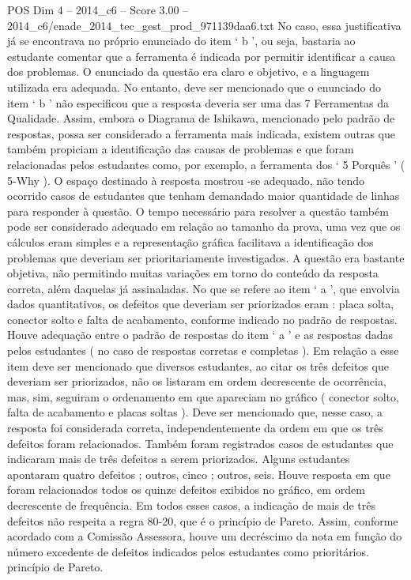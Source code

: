 \begin{textsample}{POS Dim 4 – 2014\_c6 – Score 3.00 – 2014\_c6/enade\_2014\_tec\_gest\_prod\_971139daa6.txt}
No caso, essa justificativa já se encontrava no próprio enunciado do item ‘ b ’, ou seja, bastaria ao estudante comentar que a ferramenta é indicada por permitir identificar a causa dos problemas.
O enunciado da questão era claro e objetivo, e a linguagem utilizada era adequada.
No entanto, deve ser mencionado que o enunciado do item ‘ b ’ não especificou que a resposta deveria ser uma das 7 Ferramentas da Qualidade.
Assim, embora o Diagrama de Ishikawa, mencionado pelo padrão de respostas, possa ser considerado a ferramenta mais indicada, existem outras que também propiciam a identificação das causas de problemas e que foram relacionadas pelos estudantes como, por exemplo, a ferramenta dos ‘ 5 Porquês ’ ( 5-Why ).
O espaço destinado à resposta mostrou -se adequado, não tendo ocorrido casos de estudantes que tenham demandado maior quantidade de linhas para responder à questão.
O tempo necessário para resolver a questão também pode ser considerado adequado em relação ao tamanho da prova, uma vez que os cálculos eram simples e a representação gráfica facilitava a identificação dos problemas que deveriam ser prioritariamente investigados.
A questão era bastante objetiva, não permitindo muitas variações em torno do conteúdo da resposta correta, além daquelas já assinaladas.
No que se refere ao item ‘ a ’, que envolvia dados quantitativos, os defeitos que deveriam ser priorizados eram : placa solta, conector solto e falta de acabamento, conforme indicado no padrão de respostas.
Houve adequação entre o padrão de respostas do item ‘ a ’ e as respostas dadas pelos estudantes ( no caso de respostas corretas e completas ).
Em relação a esse item deve ser mencionado que diversos estudantes, ao citar os três defeitos que deveriam ser priorizados, não os listaram em ordem decrescente de ocorrência, mas, sim, seguiram o ordenamento em que apareciam no gráfico ( conector solto, falta de acabamento e placas soltas ).
Deve ser mencionado que, nesse caso, a resposta foi considerada correta, independentemente da ordem em que os três defeitos foram relacionados.
Também foram registrados casos de estudantes que indicaram mais de três defeitos a serem priorizados.
Alguns estudantes apontaram quatro defeitos ; outros, cinco ; outros, seis.
Houve resposta em que foram relacionados todos os quinze defeitos exibidos no gráfico, em ordem decrescente de frequência.
Em todos esses casos, a indicação de mais de três defeitos não respeita a regra 80-20, que é o princípio de Pareto.
Assim, conforme acordado com a Comissão Assessora, houve um decréscimo da nota em função do número excedente de defeitos indicados pelos estudantes como prioritários. princípio de Pareto.

\end{textsample}
